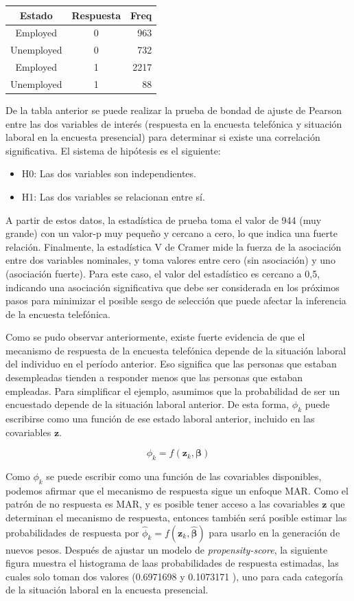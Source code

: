 \documentclass[
  12pt,
]{book}
\providecommand{\tightlist}{%
  \setlength{\itemsep}{0pt}\setlength{\parskip}{0pt}}
\begin{document}
\begin{longtable}{ccr}
\toprule
Estado & Respuesta & Freq \\ 
\midrule
Employed & 0 & 963 \\ 
Unemployed & 0 & 732 \\ 
Employed & 1 & 2217 \\ 
Unemployed & 1 & 88 \\ 
\bottomrule
\end{longtable}

De la tabla anterior se puede realizar la prueba de bondad de ajuste de Pearson entre las dos variables de interés (respuesta en la encuesta telefónica y situación laboral en la encuesta presencial) para determinar si existe una correlación significativa. El sistema de hipótesis es el siguiente:

\begin{itemize}
\tightlist
\item
  H0: Las dos variables son independientes.
\item
  H1: Las dos variables se relacionan entre sí.
\end{itemize}

A partir de estos datos, la estadística de prueba toma el valor de 944 (muy grande) con un valor-p muy pequeño y cercano a cero, lo que indica una fuerte relación. Finalmente, la estadística V de Cramer mide la fuerza de la asociación entre dos variables nominales, y toma valores entre cero (sin asociación) y uno (asociación fuerte). Para este caso, el valor del estadístico es cercano a 0,5, indicando una asociación significativa que debe ser considerada en los próximos pasos para minimizar el posible sesgo de selección que puede afectar la inferencia de la encuesta telefónica.

Como se pudo observar anteriormente, existe fuerte evidencia de que el mecanismo de respuesta de la encuesta telefónica depende de la situación laboral del individuo en el período anterior. Eso significa que las personas que estaban desempleadas tienden a responder menos que las personas que estaban empleadas. Para simplificar el ejemplo, asumimos que la probabilidad de ser un encuestado depende de la situación laboral anterior. De esta forma, \(\phi_k\) puede escribirse como una función de ese estado laboral anterior, incluido en las covariables \(\mathbf{z}\).

\[
{\phi}_k = f(\mathbf{z}_k, {\boldsymbol{\beta}})   
\]

Como \(\phi_k\) se puede escribir como una función de las covariables disponibles, podemos afirmar que el mecanismo de respuesta sigue un enfoque MAR. Como el patrón de no respuesta es MAR, y es posible tener acceso a las covariables \(\mathbf{z}\) que determinan el mecanismo de respuesta, entonces también será posible estimar las probabilidades de respuesta por \(\hat{\phi}_k = f(\mathbf{z }_k, \hat{\boldsymbol{\beta}})\) para usarlo en la generación de nuevos pesos. Después de ajustar un modelo de \emph{propensity-score}, la siguiente figura muestra el histograma de laas probabilidades de respuesta estimadas, las cuales solo toman dos valores (0.6971698 y 0.1073171 ), uno para cada categoría de la situación laboral en la encuesta presencial.
\end{document}
